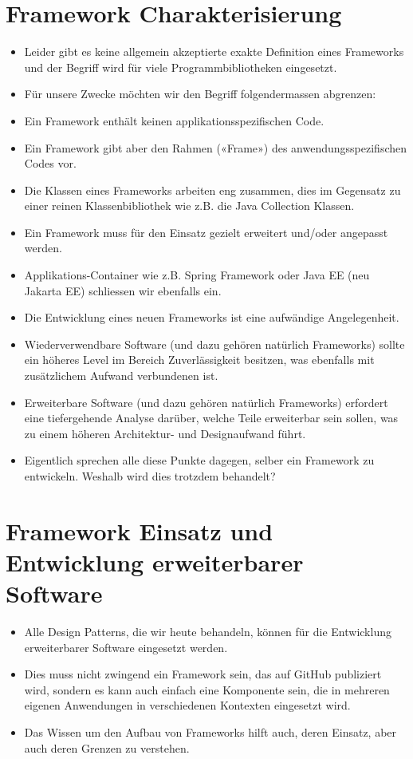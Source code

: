 \section*{Framework Charakterisierung}
\begin{itemize}
  \item Leider gibt es keine allgemein akzeptierte exakte Definition eines Frameworks und der Begriff wird für viele Programmbibliotheken eingesetzt.
  \item Für unsere Zwecke möchten wir den Begriff folgendermassen abgrenzen:
  \item Ein Framework enthält keinen applikationsspezifischen Code.
  \item Ein Framework gibt aber den Rahmen («Frame») des anwendungsspezifischen Codes vor.
  \item Die Klassen eines Frameworks arbeiten eng zusammen, dies im Gegensatz zu einer reinen Klassenbibliothek wie z.B. die Java Collection Klassen.
  \item Ein Framework muss für den Einsatz gezielt erweitert und/oder angepasst werden.
  \item Applikations-Container wie z.B. Spring Framework oder Java EE (neu Jakarta EE) schliessen wir ebenfalls ein.
  \item Die Entwicklung eines neuen Frameworks ist eine aufwändige Angelegenheit.
  \item Wiederverwendbare Software (und dazu gehören natürlich Frameworks) sollte ein höheres Level im Bereich Zuverlässigkeit besitzen, was ebenfalls mit zusätzlichem Aufwand verbundenen ist.
  \item Erweiterbare Software (und dazu gehören natürlich Frameworks) erfordert eine tiefergehende Analyse darüber, welche Teile erweiterbar sein sollen, was zu einem höheren Architektur- und Designaufwand führt.
  \item Eigentlich sprechen alle diese Punkte dagegen, selber ein Framework zu entwickeln. Weshalb wird dies trotzdem behandelt?
\end{itemize}

\section*{Framework Einsatz und Entwicklung erweiterbarer Software}
\begin{itemize}
  \item Alle Design Patterns, die wir heute behandeln, können für die Entwicklung erweiterbarer Software eingesetzt werden.
  \item Dies muss nicht zwingend ein Framework sein, das auf GitHub publiziert wird, sondern es kann auch einfach eine Komponente sein, die in mehreren eigenen Anwendungen in verschiedenen Kontexten eingesetzt wird.
  \item Das Wissen um den Aufbau von Frameworks hilft auch, deren Einsatz, aber auch deren Grenzen zu verstehen.
\end{itemize}

